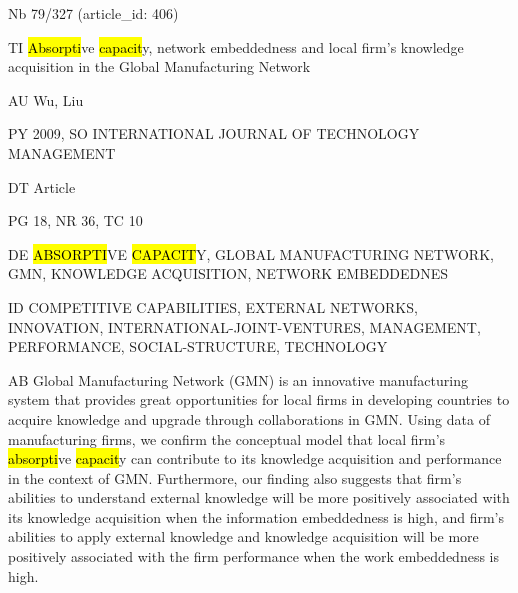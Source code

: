 \documentclass[a4paper]{article}
\begin{document}
\vspace*{-2cm}
Nb \tabto{0cm}79/327 (article\_id: 406)\par
TI \tabto{0cm}\hl{Absorpti}ve \hl{capacit}y, network embeddedness and local firm's knowledge acquisition in the Global Manufacturing Network\par
AU \tabto{0cm}Wu, Liu\par
PY \tabto{0cm}2009, SO INTERNATIONAL JOURNAL OF TECHNOLOGY MANAGEMENT\par
DT \tabto{0cm}Article\par
PG \tabto{0cm}18, NR 36, TC 10\par
DE \tabto{0cm}\hl{ABSORPTI}VE \hl{CAPACIT}Y, GLOBAL MANUFACTURING NETWORK, GMN, KNOWLEDGE ACQUISITION, NETWORK EMBEDDEDNES\par
ID \tabto{0cm}COMPETITIVE CAPABILITIES, EXTERNAL NETWORKS, INNOVATION, INTERNATIONAL-JOINT-VENTURES, MANAGEMENT, PERFORMANCE, SOCIAL-STRUCTURE, TECHNOLOGY\par
AB \tabto{0cm}Global Manufacturing Network (GMN) is an innovative manufacturing system that provides great opportunities for local firms in developing countries to acquire knowledge and upgrade through collaborations in GMN. Using data of manufacturing firms, we confirm the conceptual model that local firm's \hl{absorpti}ve \hl{capacit}y can contribute to its knowledge acquisition and performance in the context of GMN. Furthermore, our finding also suggests that firm's abilities to understand external knowledge will be more positively associated with its knowledge acquisition when the information embeddedness is high, and firm's abilities to apply external knowledge and knowledge acquisition will be more positively associated with the firm performance when the work embeddedness is high.\par
\clearpage
\end{document}
